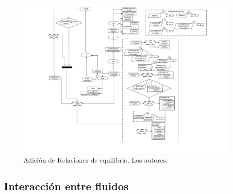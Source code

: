\begin{figure}[h]
	\centering%
	\includegraphics[width=0.9\linewidth]{Fig/Equilibrium.pdf}%
	\caption[Adición de Relaciones de equilibrio.]{Adición de Relaciones de equilibrio. Los autores.} \label{fig:EqRelation}
\end{figure}

\subsection{Interacción entre fluidos}\label{sec:PS_Interphase}
%


